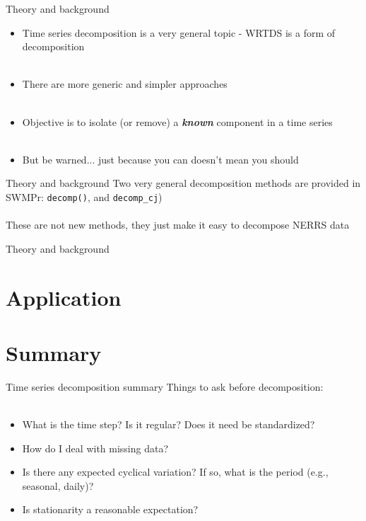 \documentclass[xcolor=dvipsnames,serif]{beamer}\usepackage[]{graphicx}\usepackage[]{color}
\newcommand{\Bigtxt}[1]{\textbf{\textit{#1}}}
\begin{document}
\begin{frame}{Theory and background}
\begin{itemize}
\item<1-> Time series decomposition is a very general topic - WRTDS is a form of decomposition \\~\\
\item<2-> There are more generic and simpler approaches \\~\\
\item<3-> Objective is to isolate (or remove) a \Bigtxt{known} component in a time series \\~\\
\item<4-> But be warned... just because you can doesn't mean you should
\end{itemize}
\end{frame}

\begin{frame}{Theory and background}
Two very general decomposition methods are provided in SWMPr: \texttt{decomp()}, and \texttt{decomp_cj}) \\~\\
These are not new methods, they just make it easy to decompose NERRS data
\end{frame}

\begin{frame}{Theory and background}

\end{frame}

\section{Application}

\section{Summary}

\begin{frame}{Time series decomposition summary}{}
Things to ask before decomposition: \\~\\
\begin{itemize}
\item What is the time step? Is it regular? Does it need be standardized?
\item How do I deal with missing data?
\item Is there any expected cyclical variation? If so, what is the period (e.g., seasonal, daily)?
\item Is stationarity a reasonable expectation? 
\end{itemize}
\end{frame}
\end{document}
